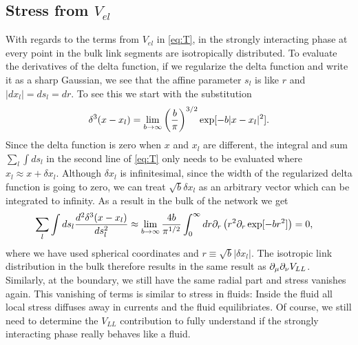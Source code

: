 \documentclass[endfloats,nofootinbib,preprint,floatfix,titlepage,superscriptaddress]{revtex4} %
\begin{document}
\subsection{Stress from $V_{el}$}
With regards to the terms from $V_{el}$ in \eqref{eq:T}, in the strongly interacting phase at every point in the bulk link segments are isotropically distributed. 
To evaluate the derivatives of the delta function, if we regularize the delta function and write it as a sharp Gaussian, we see that the affine parameter $s_l$ is like $r$ and $|dx_l|= ds_l = dr$. 
To see this we start with the substitution
\[\delta^3(x-x_l) = \lim_{b\to \infty } \left({b \over\pi}\right)^{3/2} \exp[-b|x-x_l|^2].\]
Since the delta function is zero when $x$ and $x_l$ are different, the integral and sum $\sum_l\int ds_l$ in the second line of \eqref{eq:T} only needs to be evaluated where $x_l \approx x+\delta x_l $. 
Although $\delta x_l$ is infinitesimal, since the width of the regularized delta function is going to zero, we can treat $\sqrt{b}\delta x_l$ as an arbitrary vector which can be integrated to infinity. 
As a result in the bulk of the network we get 
\begin{align}\sum_l\int ds_l {d^2 \delta^3(x-x_l)\over ds_l^2} & \approx 
    \lim_{b\to \infty } {4b \over \pi^{1/2}} \int_0^\infty d r {\partial_r} \left(r^2 \partial_r \exp[-br^2]\right) = 0, 
\end{align}
where we have used spherical coordinates and $r \equiv \sqrt{b} | \delta x_l| $.
The isotropic link distribution in the bulk therefore results in the same result as $  \partial_\mu \partial_\nu V_{LL}$.
Similarly, at the boundary, we still have the same radial part and stress vanishes again. 
This vanishing of terms is similar to stress in fluids: Inside the fluid all local stress diffuses away in currents and the fluid equilibriates. 
Of course, we still need to determine the $V_{LL}$ contribution to fully understand if the strongly interacting phase really behaves like a fluid. 
\end{document}
